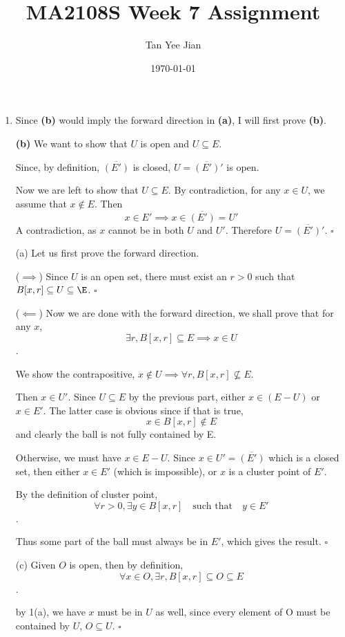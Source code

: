 \documentclass[11pt]{article}
\author{Tan Yee Jian}
\date{\today}
\title{MA2108S Week 7 Assignment}
\begin{document}
\maketitle
\begin{enumerate}
\item Since \textbf{(b)} would imply the forward direction in \textbf{(a)}, I will first prove \textbf{(b)}.

\textbf{(b)} We want to show that \(U\) is open and \(U \subseteq E\).

Since, by definition, \(\overline{(E')}\) is closed, \(U = \overline{(E')}'\)
is open.

Now we are left to show that \(U \subseteq E\). By contradiction, for any
\(x \in U\), we assume that \(x \notin E\). Then
\[
   x \in E' \implies x \in \overline{(E')} = U'
   \]
A contradiction, as \(x\) cannot be in both \(U\) and \(U'\). Therefore \(U =
   \overline{(E')}'\). \(\square\)

(a) Let us first prove the forward direction.

(\(\implies\)) Since \(U\) is an open set, there must exist an \(r > 0\) such
that \(B[x,r] \subseteq U \subseteq \E\). \(\square\)

(\(\impliedby\)) Now we are done with the forward direction, we shall prove that for any
\(x\),
\[
   \exists r, B[x,r] \subseteq E \implies x \in U
   \].

We show the contrapositive, \(x \notin U \implies \forall r, B[x,r]
   \nsubseteq E\).

Then \(x \in U'\). Since \(U \subseteq E\) by the previous part, either
\(x \in (E - U)\) or \(x \in E'\). The latter case is obvious since if that
is true,
\[ x \in B[x,r] \notin E \] and clearly the ball is not fully contained by E.

Otherwise, we must have \(x \in E - U\). Since \(x \in U' = \overline{(E')}\) which is a
closed set, then either \(x \in E'\) (which is impossible), or \(x\) is a
cluster point of \(E'\).

By the definition of cluster point,
\[
   \forall r > 0, \exists y \in B[x,r] \quad \text{such that} \quad y \in E'
   \].

Thus some part of the ball must always be in \(E'\), which gives the result.
\(\square\)

(c) Given \(O\) is open, then by definition,
\[
   \forall x \in O, \exists r, B[x,r] \subseteq O \subseteq E
   \].

by 1(a), we have \(x\) must be in \(U\) as well, since every element of O
must be contained by \(U\), \(O \subseteq U\). \(\square\)


\end{enumerate}
\end{document}
